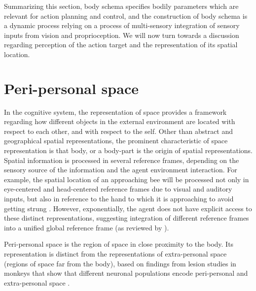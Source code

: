 Summarizing this section, body schema specifies bodily parameters which are relevant for action planning and control, and the construction of body schema is a dynamic process relying on a process of multi-sensory integration of sensory inputs from vision and proprioception. We will now turn towards a discussion regarding perception of the action target and the representation of its spatial location.

 \section{Peri-personal space}

 

 In the cognitive system, the representation of space provides a framework regarding how different objects in the external environment are located with respect to each other, and with respect to the self. Other than abstract and geographical spatial representations, the prominent characteristic of space representation is that body, or a body-part is the origin of spatial representations. Spatial information is processed in several reference frames, depending on the sensory source of the information and the agent environment interaction. For example, the spatial location of an approaching bee will be processed not only in eye-centered and head-centered reference frames due to visual and auditory inputs, but also in reference to the hand to which it is approaching to avoid getting strung \cite{serino2019peripersonal}. However, exponentially, the agent does not have explicit access to these distinct representations, suggesting integration of different reference frames into a unified global reference frame (as reviewed by ). 

Peri-personal space is the region of space in close proximity to the body. Its representation is distinct from the representations of extra-personal space (regions of space far from the body), based on findings from lesion studies in monkeys that show that different neuronal populations encode peri-personal and extra-personal space \cite{rizzolatti1983deficits}.

 
